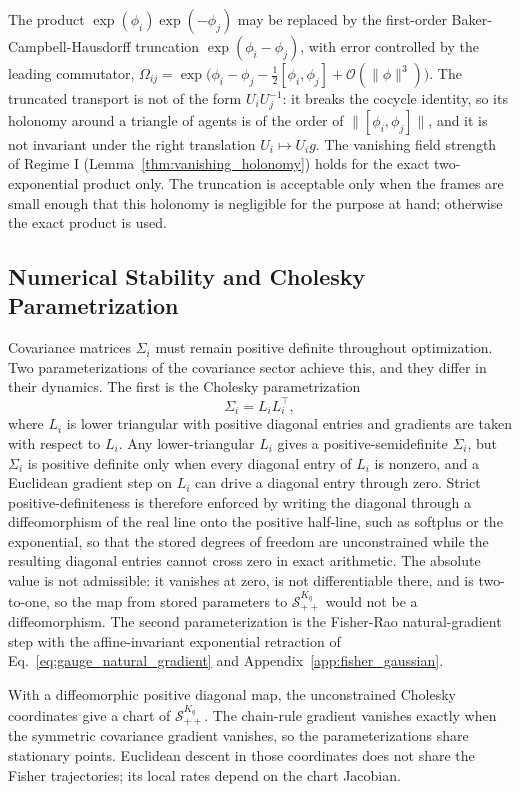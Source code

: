 The product $\exp(\phi_i)\exp(-\phi_j)$ may be replaced by the first-order Baker-Campbell-Hausdorff truncation $\exp(\phi_i - \phi_j)$, with error controlled by the leading commutator, $\Omega_{ij} = \exp\big(\phi_i - \phi_j - \tfrac{1}{2}[\phi_i, \phi_j] + \mathcal{O}(\|\phi\|^3)\big)$. The truncated transport is not of the form $U_iU_j^{-1}$: it breaks the cocycle identity, so its holonomy around a triangle of agents is of the order of $\|[\phi_i, \phi_j]\|$, and it is not invariant under the right translation $U_i \mapsto U_i g$. The vanishing field strength of Regime I (Lemma~\ref{thm:vanishing_holonomy}) holds for the exact two-exponential product only. The truncation is acceptable only when the frames are small enough that this holonomy is negligible for the purpose at hand; otherwise the exact product is used.

\subsection{Numerical Stability and Cholesky Parametrization}

Covariance matrices $\Sigma_i$ must remain positive definite throughout optimization. Two parameterizations of the covariance sector achieve this, and they differ in their dynamics. The first is the Cholesky parametrization
\begin{equation}
\Sigma_i = L_i L_i^\top,
\end{equation}
where $L_i$ is lower triangular with positive diagonal entries and gradients are taken with respect to $L_i$. Any lower-triangular $L_i$ gives a positive-semidefinite $\Sigma_i$, but $\Sigma_i$ is positive definite only when every diagonal entry of $L_i$ is nonzero, and a Euclidean gradient step on $L_i$ can drive a diagonal entry through zero. Strict positive-definiteness is therefore enforced by writing the diagonal through a diffeomorphism of the real line onto the positive half-line, such as softplus or the exponential, so that the stored degrees of freedom are unconstrained while the resulting diagonal entries cannot cross zero in exact arithmetic. The absolute value is not admissible: it vanishes at zero, is not differentiable there, and is two-to-one, so the map from stored parameters to $\mathcal{S}_{++}^{K_q}$ would not be a diffeomorphism. The second parameterization is the Fisher-Rao natural-gradient step with the affine-invariant exponential retraction of Eq.~\eqref{eq:gauge_natural_gradient} and Appendix~\ref{app:fisher_gaussian}.

With a diffeomorphic positive diagonal map, the unconstrained Cholesky coordinates give a chart of $\mathcal S_{++}^{K_q}$. The chain-rule gradient vanishes exactly when the symmetric covariance gradient vanishes, so the parameterizations share stationary points. Euclidean descent in those coordinates does not share the Fisher trajectories; its local rates depend on the chart Jacobian.

